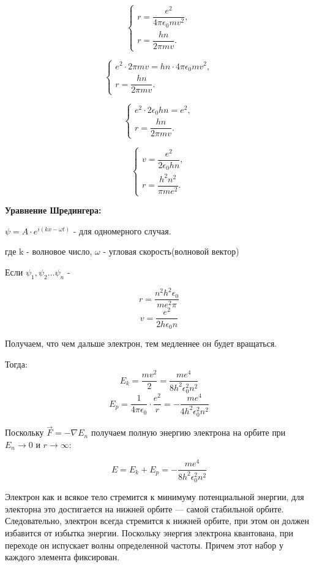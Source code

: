 \documentclass[../main.tex]{subfiles}
\begin{document}
\[
\begin{cases}
r = \dfrac{e^2}{4 \pi \epsilon_0 m v^2},\\[4pt]
r = \dfrac{h n}{2 \pi m v}.
\end{cases}
\]

\[
\begin{cases}
e^2 \cdot 2 \pi m v = h n \cdot 4 \pi \epsilon_0 m v^2,\\[4pt]
r = \dfrac{h n}{2 \pi m v}.
\end{cases}
\]

\[
\begin{cases}
e^2 \cdot 2 \epsilon_0 h n = e^2,\\[4pt]
r = \dfrac{h n}{2 \pi m v}.
\end{cases}
\]

\[
\begin{cases}
v = \dfrac{e^2}{2 \epsilon_0 h n},\\[4pt]
r = \dfrac{h^2 n^2}{\pi m e^2}.
\end{cases}
\]

\textbf{Уравнение Шредингера:}


\begin{center}
\(\displaystyle \psi = A \cdot e^{i(kx - \omega t)}\) - для одномерного случая.    
\end{center}



\begin{center}
    где k - волновое число, $\omega$ - угловая скорость(волновой вектор)
\end{center}
Если $\psi_1, \psi_2 \ldots \psi_n$ - 

\[r = \frac{n^2 h^2 \epsilon_0}{m e^2 \pi}\]
\[v = \frac{e^2}{2h \epsilon_0 n}\]

Получаем, что чем дальше электрон, тем медленнее он будет вращаться.

Тогда:
\[E_k = \frac{mv^2}{2} = \frac{me^4}{8h^2 \epsilon_0^2 n^2}\]
\[E_p = \frac{1}{4 \pi \epsilon_0} \cdot \frac{e^2}{r} = - \frac{m e^4}{4 h^2 \epsilon_0^2 n^2}\]

Поскольку $\vec F = - \nabla E_n$ получаем полную энергию электрона на орбите при $E_n \to 0$ и $r \to \infty$:

\[E = E_k + E_p = - \frac{me^4}{8 h^2 \epsilon_0 ^2 n^2}\]

Электрон как и всякое тело стремится к минимуму потенциальной энергии, для электорна это достигается на нижней орбите --- самой стабильной орбите. 
Следовательно, электрон всегда стремится к нижней орбите, при этом он должен избавится от избытка энергии. 
Поскольку энергия электрона квантована, при переходе он испускает волны определенной частоты.
Причем этот набор у каждого элемента фиксирован. 
\end{document}
